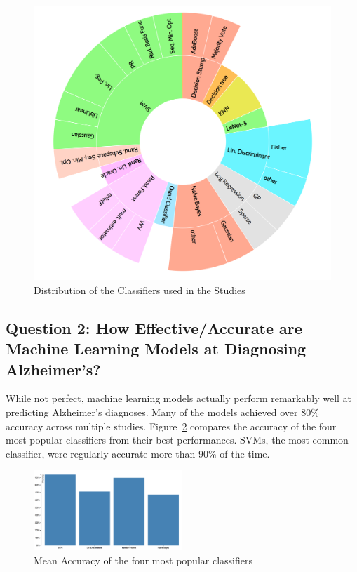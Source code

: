 \documentclass[pageno]{jpaper}
\begin{document}
\begin{figure}[H]
    \centering
    \includegraphics[scale=0.25]{data_visualization/bilevel_partition2.png}
    \caption{Distribution of the Classifiers used in the Studies}
\label{fig:figure1}
\end{figure}
 


\subsection{Question 2: How Effective/Accurate are Machine Learning Models at Diagnosing Alzheimer's?}
\label{sub:Question 2: How Effective/Accurate are Machine Learning Models at Diagnosing Alzheimer's?}
While not perfect, machine learning models actually perform remarkably well at 
predicting Alzheimer's diagnoses. Many of the models achieved over 80\% accuracy
across multiple studies. Figure~\ref{fig:figure2} compares the accuracy of the four 
most popular classifiers from their best performances. SVMs, the most common 
classifier, were regularly accurate more than 90\% of the time.

\begin{figure}[!ht]
    \centering
    \includegraphics[width=0.5\textwidth]{data_visualization/bar_chart.png}
    \caption{Mean Accuracy of the four most popular classifiers}
\label{fig:figure2}
\end{figure}
\end{document}

